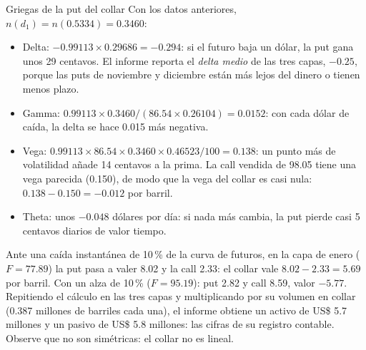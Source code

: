 \begin{ejemplo}{Griegas de la put del collar}
Con los datos anteriores, $n(d_1)=n(0.5334)=0.3460$:
\begin{itemize}
\item Delta: $-0.99113\times0.29686=-0.294$: si el futuro baja un dólar, la put gana unos 29 centavos. El informe reporta el \emph{delta medio} de las tres capas, $-0.25$, porque las puts de noviembre y diciembre están más lejos del dinero o tienen menos plazo.
\item Gamma: $0.99113\times0.3460/(86.54\times0.26104)=0.0152$: con cada dólar de caída, la delta se hace 0.015 más negativa.
\item Vega: $0.99113\times86.54\times0.3460\times0.46523/100=0.138$: un punto más de volatilidad añade 14 centavos a la prima. La call vendida de 98.05 tiene una vega parecida (0.150), de modo que la vega del collar es casi nula: $0.138-0.150=-0.012$ por barril.
\item Theta: unos $-0.048$ dólares por día: si nada más cambia, la put pierde casi 5 centavos diarios de valor tiempo.
\end{itemize}
\end{ejemplo}



\begin{informe}
Ante una caída instantánea de 10\,\% de la curva de futuros, en la capa de enero ($F=77.89$) la put pasa a valer 8.02 y la call 2.33: el collar vale $8.02-2.33=5.69$ por barril. Con un alza de 10\,\% ($F=95.19$): put 2.82 y call 8.59, valor $-5.77$. Repitiendo el cálculo en las tres capas y multiplicando por su volumen en collar (0.387 millones de barriles cada una), el informe obtiene un activo de US\$ 5.7 millones y un pasivo de US\$ 5.8 millones: las cifras de su registro contable. Observe que no son simétricas: el collar no es lineal.
\end{informe}


